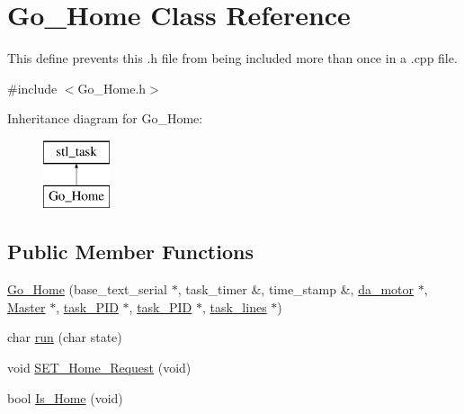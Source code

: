 \hypertarget{class_go___home}{\section{Go\-\_\-\-Home Class Reference}
\label{class_go___home}
}


This define prevents this .h file from being included more than once in a .cpp file.  




{\ttfamily \#include $<$Go\-\_\-\-Home.\-h$>$}

Inheritance diagram for Go\-\_\-\-Home\-:\begin{figure}[H]
\begin{center}
\leavevmode
\includegraphics[height=2.000000cm]{class_go___home}
\end{center}
\end{figure}
\subsection*{Public Member Functions}
\begin{DoxyCompactItemize}
\item 
\hyperlink{class_go___home_a080085bcc6207561d5309d5f861b10cf}{Go\-\_\-\-Home} (base\-\_\-text\-\_\-serial $\ast$, task\-\_\-timer \&, time\-\_\-stamp \&, \hyperlink{classda__motor}{da\-\_\-motor} $\ast$, \hyperlink{class_master}{Master} $\ast$, \hyperlink{classtask___p_i_d}{task\-\_\-\-P\-I\-D} $\ast$, \hyperlink{classtask___p_i_d}{task\-\_\-\-P\-I\-D} $\ast$, \hyperlink{classtask__lines}{task\-\_\-lines} $\ast$)
\item 
char \hyperlink{class_go___home_ae1421efd3ca49627022675f74534ced6}{run} (char state)
\item 
void \hyperlink{class_go___home_a1c22463a7cca8fd6a8ab4c5c9ecee6ff}{S\-E\-T\-\_\-\-Home\-\_\-\-Request} (void)
\item 
bool \hyperlink{class_go___home_a23ee51618c74f918af0ddf4555c7ff04}{Is\-\_\-\-Home} (void)
\end{DoxyCompactItemize}
